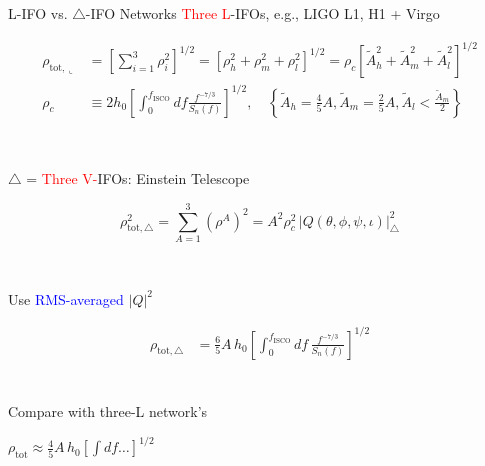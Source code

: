 \documentclass[xcolor=dvipsnames,handout,t]{beamer}
\newcommand{\red}[1]{\textcolor{red}{#1}}
\newcommand{\bl}[1]{\textcolor{blue}{#1}}
\newcommand{\f}{\frac}
\begin{document}
\begin{frame}{L-IFO vs. $\bigtriangleup$-IFO Networks}
\red{Three L}-IFOs, e.g., LIGO L1, H1 + Virgo
%
  \begin{footnotesize} 
  \begin{align*}
  \rho_{\text{tot},\llcorner} &= \left[{\sum_{i=1}^3 \rho^2_i}\right]^{1/2} =\left[ \rho_h^2 + \rho_m^2 + \rho^2_l \right]^{1/2} 
	  = {\rho_c\left[\tilde{A}_h^2 + \tilde{A}_m^2 + \tilde{A}_l^2 \right]^{1/2}}\\
  \rho_c &\equiv 2 h_0 \left[ \int_0^{{f_\text{ISCO}}} df \f{f^{-7/3}}{S_n(f)}  \right]^{1/2}, \quad \left\{ \tilde{A}_h = \tfrac{4}{5}A,  \tilde{A}_m =\tfrac{2}{5}A,  \tilde{A}_l  < \tfrac{\tilde{A}_m}{2}\right\}
  \end{align*}
  \end{footnotesize}
  \\
  {
    $\bigtriangleup$ = \red{Three V-}IFOs: Einstein Telescope
    \begin{footnotesize} 
    \[
    \rho^2_{\text{tot},\bigtriangleup} = \sum_{A=1}^3 \left(\rho^A\right)^2  =  A^2 \rho_c^2 \,|Q(\theta,\phi,\psi,\iota)|_\bigtriangleup^2 %
    \]
    \end{footnotesize}
    \\
  }
  Use \bl{RMS-averaged} $|Q|^2$
  \begin{footnotesize}
  \begin{align*}
  \rho_{\text{tot},\bigtriangleup} %
  &=\f{6}{5}A\, h_0 \left[\int_0^{f_\text{ISCO}} d f\, \f{f^{-7/3}}{S_n(f)}\right]^{1/2} \\
  \end{align*}
  \end{footnotesize}
  \\
  \vspace{-5mm}
  Compare with three-L network's \begin{small}$\rho_\text{tot} \approx \tfrac{4}{5}A\, h_0 \left[ \int df \ldots \right]^{1/2} $ \end{small}
  \vspace{10mm}
\end{frame}
\end{document}
